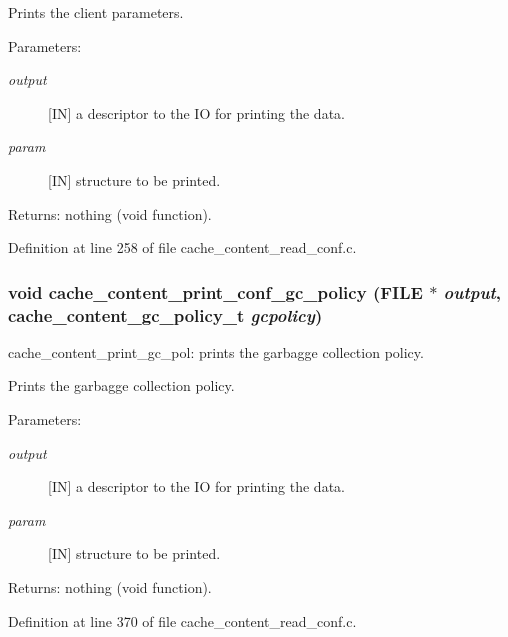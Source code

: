 Prints the client parameters.

\begin{Desc}
\item[Parameters:]
\begin{description}
\item[{\em output}][IN] a descriptor to the IO for printing the data. \item[{\em param}][IN] structure to be printed.\end{description}
\end{Desc}
\begin{Desc}
\item[Returns:]nothing (void function). \end{Desc}


Definition at line 258 of file cache\_\-content\_\-read\_\-conf.c.
\subsubsection{\setlength{\rightskip}{0pt plus 5cm}void cache\_\-content\_\-print\_\-conf\_\-gc\_\-policy (FILE $\ast$ {\em output}, cache\_\-content\_\-gc\_\-policy\_\-t {\em gcpolicy})}\label{cache__content__read__conf_8c_a3}


cache\_\-content\_\-print\_\-gc\_\-pol: prints the garbagge collection policy.

Prints the garbagge collection policy.

\begin{Desc}
\item[Parameters:]
\begin{description}
\item[{\em output}][IN] a descriptor to the IO for printing the data. \item[{\em param}][IN] structure to be printed.\end{description}
\end{Desc}
\begin{Desc}
\item[Returns:]nothing (void function). \end{Desc}


Definition at line 370 of file cache\_\-content\_\-read\_\-conf.c.
